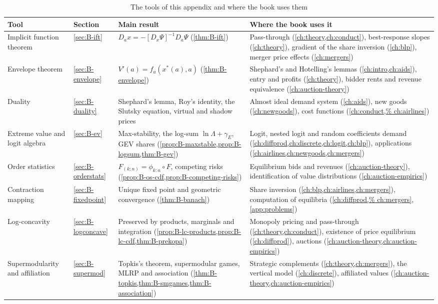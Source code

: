 \begin{table}[!tb]
\centering
\caption{The tools of this appendix and where the book uses them}\label{tab:B-toolmap}
\footnotesize
\renewcommand{\arraystretch}{1.3}
\begin{tabularx}{\textwidth}{@{}>{\raggedright\arraybackslash}p{2.6cm}>{\raggedright\arraybackslash}p{1.3cm}%
>{\raggedright\arraybackslash}p{4.1cm}>{\raggedright\arraybackslash}X@{}}
\toprule
Tool & Section & Main result & Where the book uses it \\
\midrule
Implicit function theorem & \ref{sec:B-ift} & $D_a x = -[D_x\Psi]^{-1}D_a\Psi$ (\cref{thm:B-ift}) &
  Pass-through (\cref{ch:theory,ch:conduct}), best-response slopes (\cref{ch:theory}), gradient of the share
  inversion (\cref{ch:blp}), merger price effects (\cref{ch:mergers}) \\
Envelope theorem & \ref{sec:B-envelope} & $V'(a) = f_a(x^*(a), a)$ (\cref{thm:B-envelope}) &
  Shephard's and Hotelling's lemmas (\cref{ch:intro,ch:aids}), entry and profits (\cref{ch:theory}), bidder rents
  and revenue equivalence (\cref{ch:auction-theory}) \\
Duality & \ref{sec:B-duality} & Shephard's lemma, Roy's identity, the Slutsky equation, virtual and shadow
  prices &
  Almost ideal demand system (\cref{ch:aids}), new goods (\cref{ch:newgoods}), cost functions (\cref{ch:conduct,%
  ch:airlines}) \\
Extreme value and logit algebra & \ref{sec:B-ev} & Max-stability, the log-sum $\ln\Lambda + \gamma_E$, GEV shares
  (\cref{prop:B-maxstable,prop:B-logsum,thm:B-gev}) &
  Logit, nested logit and random coefficients demand (\cref{ch:diffprod,ch:discrete,ch:logit,ch:blp}),
  applications (\cref{ch:airlines,ch:newgoods,ch:mergers}) \\
Order statistics & \ref{sec:B-orderstats} & $F_{(k:n)} = \phi_{k:n} \circ F$, competing risks
  (\cref{prop:B-os-cdf,prop:B-competing-risks}) &
  Equilibrium bids and revenues (\cref{ch:auction-theory}), identification of value distributions
  (\cref{ch:auction-empirics}) \\
Contraction mapping & \ref{sec:B-fixedpoint} & Unique fixed point and geometric convergence
  (\cref{thm:B-banach}) &
  Share inversion (\cref{ch:blp,ch:airlines,ch:mergers}), computation of equilibria (\cref{ch:diffprod,%
  ch:mergers}, \cref{app:problems}) \\
Log-concavity & \ref{sec:B-logconcave} & Preserved by products, marginals and integration
  (\cref{prop:B-lc-products,prop:B-lc-cdf,thm:B-prekopa}) &
  Monopoly pricing and pass-through (\cref{ch:theory,ch:conduct}), existence of price equilibrium
  (\cref{ch:diffprod}), auctions (\cref{ch:auction-theory,ch:auction-empirics}) \\
Supermodularity and affiliation & \ref{sec:B-supermod} & Topkis's theorem, supermodular games, MLRP and
  association (\cref{thm:B-topkis,thm:B-smgames,thm:B-association}) &
  Strategic complements (\cref{ch:theory,ch:mergers}), the vertical model (\cref{ch:discrete}), affiliated
  values (\cref{ch:auction-theory,ch:auction-empirics}) \\
\bottomrule
\end{tabularx}


\end{table}
